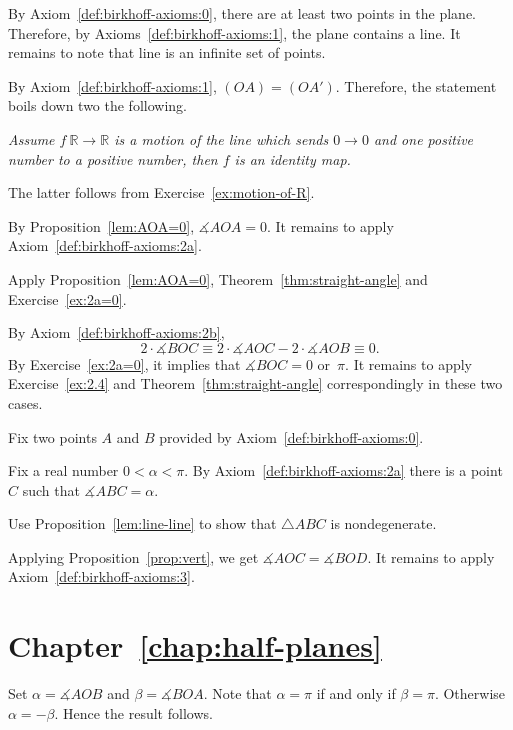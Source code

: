  By Axiom~\ref{def:birkhoff-axioms:0}, there are at least two points in the plane.
Therefore, by Axioms~\ref{def:birkhoff-axioms:1}, 
the plane contains a line. 
It remains to note that line is an infinite set of points.

\parbf{Exercise~\ref{ex:[OA)=[OA')}.}
By Axiom~\ref{def:birkhoff-axioms:1},
$(OA)=(OA')$.
Therefore, the statement boils down two the following.

\textit{Assume $f\:\mathbb{R}\to \mathbb{R}$ is a motion of the line which sends $0\to 0$ and one positive number to a positive number, then $f$ is an identity map.}

The latter follows from Exercise~\ref{ex:motion-of-R}.

By Proposition~\ref{lem:AOA=0},
$\measuredangle AOA=0$.
It remains to apply Axiom~\ref{def:birkhoff-axioms:2a}.


Apply Proposition~\ref{lem:AOA=0},
Theorem~\ref{thm:straight-angle} 
and Exercise~\ref{ex:2a=0}.


By Axiom~\ref{def:birkhoff-axioms:2b},
$$2\cdot\measuredangle BOC
\equiv 
2\cdot\measuredangle AOC-2\cdot \measuredangle AOB
\equiv 0.$$
By Exercise~\ref{ex:2a=0}, 
it implies that 
$\measuredangle BOC=0$ or~$\pi$.
It remains to apply Exercise~\ref{ex:2.4} and Theorem~\ref{thm:straight-angle} correspondingly in these two cases.

Fix two points $A$ and $B$ provided by Axiom~\ref{def:birkhoff-axioms:0}.

Fix a real number $0<\alpha<\pi$.
By Axiom~\ref{def:birkhoff-axioms:2a} there is a point $C$ such that $\measuredangle ABC=\alpha$.

Use  Proposition~\ref{lem:line-line} to show that $\triangle ABC$ is nondegenerate.

Applying Proposition~\ref{prop:vert}, we get 
$\measuredangle AOC= \measuredangle BOD$.
It remains to apply Axiom~\ref{def:birkhoff-axioms:3}.

\section*{Chapter~\ref{chap:half-planes}}
\setcounter{eqtn}{0}

Set $\alpha=\measuredangle AOB$ 
and 
$\beta=\measuredangle BOA$.
Note that $\alpha=\pi$ if and only if $\beta=\pi$.
Otherwise $\alpha=-\beta$.
Hence the result follows.


